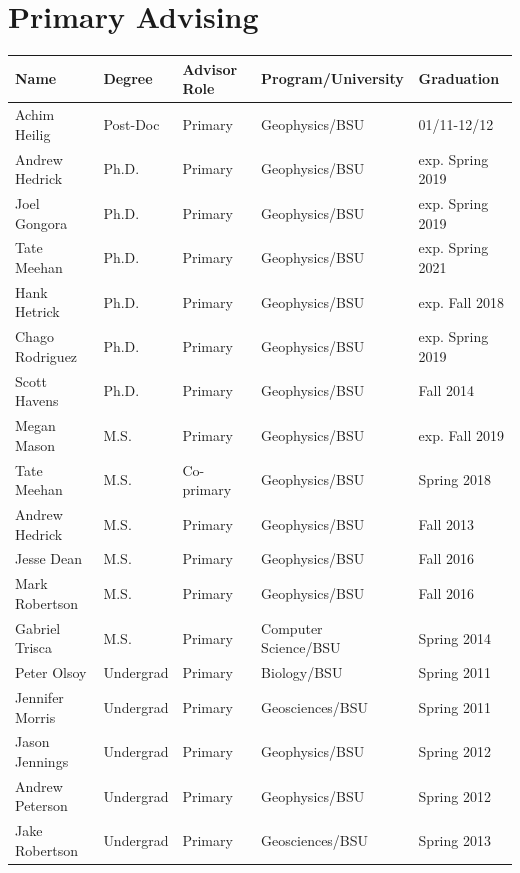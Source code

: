 \documentclass[11pt]{article}
\renewcommand\arraystretch{1}
\begin{document}
\pagebreak

\section*{Primary Advising}
\begin{table}[!htbp]
\renewcommand\arraystretch{0.7}
  \centering
  \begin{tabular}{|l|l|l|l|l|}
\hline
\textbf{Name} & \textbf{Degree} & \textbf{Advisor Role} & \textbf{Program/University} & \textbf{Graduation} \\ \hline \hline
Achim Heilig & Post-Doc & Primary & Geophysics/BSU & 01/11-12/12 \\ \hline
Andrew Hedrick & Ph.D. & Primary & Geophysics/BSU & exp. Spring 2019 \\ \hline
Joel Gongora & Ph.D. & Primary & Geophysics/BSU & exp. Spring 2019 \\ \hline
Tate Meehan & Ph.D. & Primary & Geophysics/BSU & exp. Spring 2021 \\ \hline
Hank Hetrick & Ph.D. & Primary & Geophysics/BSU & exp. Fall 2018 \\ \hline
Chago Rodriguez & Ph.D. & Primary & Geophysics/BSU & exp. Spring 2019 \\ \hline
Scott Havens & Ph.D. & Primary & Geophysics/BSU & Fall 2014 \\ \hline
Megan Mason & M.S. & Primary & Geophysics/BSU & exp. Fall 2019 \\ \hline
Tate Meehan & M.S. & Co-primary & Geophysics/BSU & Spring 2018 \\ \hline
Andrew Hedrick & M.S. & Primary & Geophysics/BSU & Fall 2013 \\ \hline
Jesse Dean & M.S. & Primary & Geophysics/BSU & Fall 2016 \\ \hline
Mark Robertson & M.S. & Primary & Geophysics/BSU & Fall 2016 \\ \hline
Gabriel Trisca & M.S. & Primary & Computer Science/BSU & Spring 2014 \\ \hline
Peter Olsoy & Undergrad & Primary & Biology/BSU & Spring 2011 \\ \hline
Jennifer Morris & Undergrad & Primary & Geosciences/BSU & Spring 2011 \\ \hline
Jason Jennings & Undergrad & Primary & Geophysics/BSU & Spring 2012 \\ \hline
Andrew Peterson & Undergrad & Primary & Geophysics/BSU & Spring 2012 \\ \hline
Jake Robertson & Undergrad & Primary & Geosciences/BSU & Spring 2013 \\ \hline

\end{tabular}
\end{table}
\end{document}
